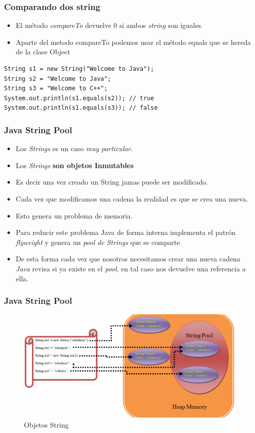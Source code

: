 \documentclass{beamer}
\begin{document}
\begin{frame}[fragile]
\frametitle{Comparando dos string}
\begin{itemize}[<+->]
\item El método \emph{compareTo} devuelve 0 si ambos \emph{string} son iguales.
\item Aparte del metodo \alert{compareTo} podemos usar el método \alert{equals} que se hereda de la clase \alert{Object} 
\end{itemize}
\pause
\begin{verbatim}
String s1 = new String("Welcome to Java");
String s2 = "Welcome to Java";
String s3 = "Welcome to C++";
System.out.println(s1.equals(s2)); // true
System.out.println(s1.equals(s3)); // false
\end{verbatim}
\end{frame}


\begin{frame}[fragile]
\frametitle{Java String Pool}
\begin{itemize}[<+->]
\item Los \emph{Strings} es un caso \emph{muy particular}. 
\item Los \emph{Strings} \textbf{son objetos Inmutables}
\item Es decir una vez creado un String jamas puede ser modificado.
\item Cada vez que modificamos una cadena la realidad es que se crea una nueva.
\item Esto genera un problema de memoria.
\item Para reducir este problema Java de forma interna implementa el patrón \emph{flyweight} y genera un \emph{pool de Strings} que se comparte 
\item De esta forma cada vez que nosotros necesitamos crear una nueva cadena \emph{Java} revisa si ya existe en el \emph{pool}, en tal caso nos devuelve una referencia a ella. 
\end{itemize}
\pause
\end{frame}

\begin{frame}
\frametitle{Java String Pool}
\begin{figure}
\includegraphics[scale=0.4]{imagenes/pool.png}
\caption{Objetos String}
\end{figure}
\end{frame}
\end{document}
